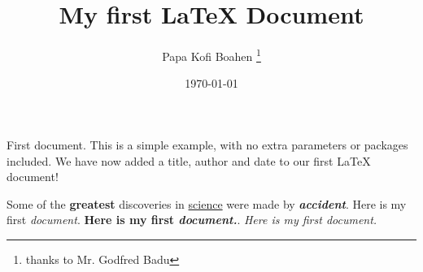 \documentclass[12pt, letterpaper, twoside]{article}
\title{My first \LaTeX{} Document}
\author{Papa Kofi Boahen \thanks{thanks to Mr. Godfred Badu}}
\date{\today}
\begin{document}
\maketitle
First document. This is a simple example, with no extra parameters or packages included. We have now added a title, author and date to our first \LaTeX{} document!

Some of the \textbf{greatest} discoveries in  \underline{science} were made by \textit{\textbf{accident}}. Here is my first \emph{document}.
\textbf{Here is my first \emph{document.}}. \textit{Here is my first \emph{document.}}
	
\end{document}

